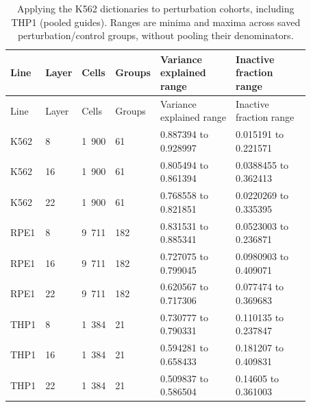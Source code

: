 \begin{longtable}{@{}L{0.1\linewidth}L{0.07\linewidth}L{0.09\linewidth}L{0.09\linewidth}L{0.26\linewidth}L{0.26\linewidth}@{}}
\caption{Applying the K562 dictionaries to perturbation cohorts, including THP1 (pooled guides). Ranges are minima and maxima across saved perturbation/control groups, without pooling their denominators.}\\
\toprule
Line & Layer & Cells & Groups & Variance explained range & Inactive fraction range \\
\midrule
\endfirsthead
\toprule
Line & Layer & Cells & Groups & Variance explained range & Inactive fraction range \\
\midrule
\endhead
\endfoot
\bottomrule
\endlastfoot
K562 & 8 & 1~900 & 61 & 0.887394 to 0.928997 & 0.015191 to 0.221571 \\
K562 & 16 & 1~900 & 61 & 0.805494 to 0.861394 & 0.0388455 to 0.362413 \\
K562 & 22 & 1~900 & 61 & 0.768558 to 0.821851 & 0.0220269 to 0.335395 \\
RPE1 & 8 & 9~711 & 182 & 0.831531 to 0.885341 & 0.0523003 to 0.236871 \\
RPE1 & 16 & 9~711 & 182 & 0.727075 to 0.799045 & 0.0980903 to 0.409071 \\
RPE1 & 22 & 9~711 & 182 & 0.620567 to 0.717306 & 0.077474 to 0.369683 \\
THP1 & 8 & 1~384 & 21 & 0.730777 to 0.790331 & 0.110135 to 0.237847 \\
THP1 & 16 & 1~384 & 21 & 0.594281 to 0.658433 & 0.181207 to 0.409831 \\
THP1 & 22 & 1~384 & 21 & 0.509837 to 0.586504 & 0.14605 to 0.361003 \\
\end{longtable}
